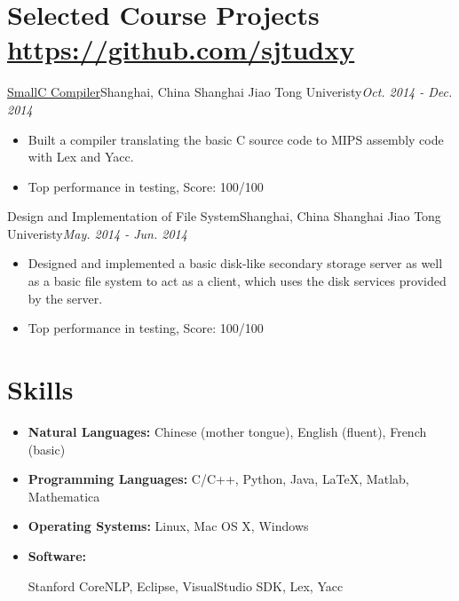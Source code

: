 \documentclass[letterpaper,12pt]{resume}
\begin{document}
\section{Selected Course Projects \hfill \url{https://github.com/sjtudxy}}
\begin{itemize}
  \credential
    {\href{https://github.com/sjtudxy/SmallC-Compilier}{SmallC Compiler}}{Shanghai, China}
    {Shanghai Jiao Tong Univeristy}{\textit{Oct. 2014 - Dec. 2014}}
    { 
    \begin{itemize}
      \item{ 
      Built a compiler translating the basic C source code to MIPS assembly code with Lex and Yacc.
        }
       \item{Top performance in testing, Score: 100/100}
    \end{itemize}
    }
    
      \credential
    {{Design and Implementation of File System}}{Shanghai, China}
    {Shanghai Jiao Tong Univeristy}{\textit{May. 2014 - Jun. 2014}}
    { 
    \begin{itemize}
      \item{ 
     Designed and implemented a basic disk-like secondary storage server as well as a basic file system to act as a client, which uses the disk services provided by the server. }
       \item{Top performance in testing, Score: 100/100}
    \end{itemize}
    }
   
\end{itemize}  %




\section{Skills}
\begin{itemize}
\item{ \bf Natural Languages:} {Chinese (mother tongue), English (fluent), French (basic)}
  \item {\bf Programming Languages:} {  C/C++, Python, Java,
   {\LaTeX}, Matlab, Mathematica }
  \item {\bf Operating Systems:} Linux, Mac OS X, Windows
   \item {\bf Software:}{ Stanford CoreNLP,  Eclipse, VisualStudio SDK, Lex, Yacc
   
    }  
\end{itemize} %
\end{document}
